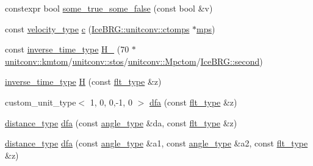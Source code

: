 \begin{DoxyCompactItemize}
\item 
constexpr bool \hyperlink{namespaceIceBRG_af2c6abeffc949083e53a7499c272a46d}{some\-\_\-true\-\_\-some\-\_\-false} (const bool \&v)
\item 
const \hyperlink{namespaceIceBRG_a34f8ef3b46f3408301e3c28197095eff}{velocity\-\_\-type} \hyperlink{namespaceIceBRG_a064ef8d17408ee9f2c81f8aa1f87155e}{c} (\hyperlink{namespaceIceBRG_1_1unitconv_a4452bf41e30df2caf01bd4494fb7da32}{Ice\-B\-R\-G\-::unitconv\-::ctomps} $\ast$\hyperlink{namespaceIceBRG_ad5f22cbf0896ee33ad84e89b40c7c065}{mps})
\item 
const \hyperlink{namespaceIceBRG_a92c76f9b2ac706653b9b12c36904712c}{inverse\-\_\-time\-\_\-type} \hyperlink{namespaceIceBRG_a5d7bd223bbc2553d0dfa6d12ee830d2b}{H\-\_} (70 $\ast$\hyperlink{namespaceIceBRG_1_1unitconv_a7376e879917949c32e630c898b3ccef4}{unitconv\-::kmtom}/\hyperlink{namespaceIceBRG_1_1unitconv_a9974944e490b1899879debccacb60a1e}{unitconv\-::stos}/\hyperlink{namespaceIceBRG_1_1unitconv_ad4408e8c25b2d1f1cb17bae1eddb5de4}{unitconv\-::\-Mpctom}/\hyperlink{namespaceIceBRG_a542d4177a57d87415daf841cf88e6b15}{Ice\-B\-R\-G\-::second})
\item 
\hyperlink{namespaceIceBRG_a92c76f9b2ac706653b9b12c36904712c}{inverse\-\_\-time\-\_\-type} \hyperlink{namespaceIceBRG_addecf77361206a35290044de4c398220}{H} (const \hyperlink{lib_2IceBRG__main_2common_8h_ad0f130a56eeb944d9ef2692ee881ecc4}{flt\-\_\-type} \&z)
\item 
custom\-\_\-unit\-\_\-type$<$ 1, 0, 0,-\/1, 0 $>$ \hyperlink{namespaceIceBRG_aa3f4f062a080eb902eb579c6b85318c7}{dfa} (const \hyperlink{lib_2IceBRG__main_2common_8h_ad0f130a56eeb944d9ef2692ee881ecc4}{flt\-\_\-type} \&z)
\item 
\hyperlink{namespaceIceBRG_a45499647eb87e24c10ab32c628711cec}{distance\-\_\-type} \hyperlink{namespaceIceBRG_a35339f67e46b35ffdd2166ccc82c9a32}{dfa} (const \hyperlink{namespaceIceBRG_a688eeb0811a2474b20b667ed2e9625a1}{angle\-\_\-type} \&da, const \hyperlink{lib_2IceBRG__main_2common_8h_ad0f130a56eeb944d9ef2692ee881ecc4}{flt\-\_\-type} \&z)
\item 
\hyperlink{namespaceIceBRG_a45499647eb87e24c10ab32c628711cec}{distance\-\_\-type} \hyperlink{namespaceIceBRG_aadcee0c5b6b0258dfef54e576a9f48d6}{dfa} (const \hyperlink{namespaceIceBRG_a688eeb0811a2474b20b667ed2e9625a1}{angle\-\_\-type} \&a1, const \hyperlink{namespaceIceBRG_a688eeb0811a2474b20b667ed2e9625a1}{angle\-\_\-type} \&a2, const \hyperlink{lib_2IceBRG__main_2common_8h_ad0f130a56eeb944d9ef2692ee881ecc4}{flt\-\_\-type} \&z)
\item 

\end{DoxyCompactItemize}
